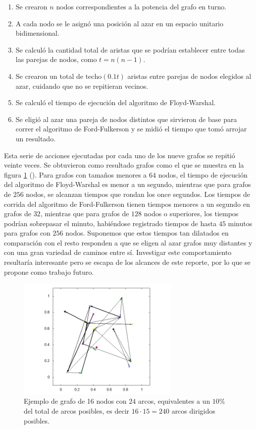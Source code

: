 \documentclass{article}
\begin{document}
  \begin{enumerate}
    \item Se crearon $n$ nodos correspondientes a la potencia del grafo en turno.
    \item A cada nodo se le asignó una posición al azar en un espacio unitario bidimensional.
    \item Se calculó la cantidad total de aristas que se podrían establecer entre todas las parejas de nodos, como $t = n (n - 1)$.
    \item Se crearon un total de $\mathrm{techo}(0.1 t)$ aristas entre parejas de nodos elegidos al azar, cuidando que no se repitieran vecinos.
    \item Se calculó el tiempo de ejecución del algoritmo de Floyd-Warshal.
    \item Se eligió al azar una pareja de nodos distintos que sirvieron de base para correr el algoritmo de Ford-Fulkerson y se midió el tiempo que tomó arrojar un resultado.
  \end{enumerate}

  Esta serie de acciones ejecutadas por cada uno de los nueve grafos se repitió veinte veces. Se obtuvieron como resultado grafos como el que se muestra en la figura \ref{fig:16} (\pageref{fig:16}). Para grafos con tamaños menores a $64$ nodos, el tiempo de ejecución del algoritmo de Floyd-Warshal es menor a un segundo, mientras que para grafos de $256$ nodos, se alcanzan tiempos que rondan los once segundos. Los tiempos de corrida del algoritmo de Ford-Fulkerson tienen tiempos menores a un segundo en grafos de $32$, mientras que para grafos de $128$ nodos o superiores, los tiempos podrían sobrepasar el minuto, habiéndose registrado tiempos de hasta $45$ minutos para grafos con $256$ nodos. Suponemos que estos tiempos tan dilatados en comparación con el resto responden a que se eligen al azar grafos muy distantes y con una gran variedad de caminos entre sí. Investigar este comportamiento resultaría interesante pero se escapa de los alcances de este reporte, por lo que se propone como trabajo futuro.

  \begin{figure}[h]
    \includegraphics[width=0.7\textwidth]{16} %
    \centering
    \caption{Ejemplo de grafo de 16 nodos con $24$ arcos, equivalentes a un $10 \%$ del total de arcos posibles, es decir $16 \cdot 15 = 240$ arcos dirigidos posibles.}
    \label{fig:16}
  \end{figure}
\end{document}
